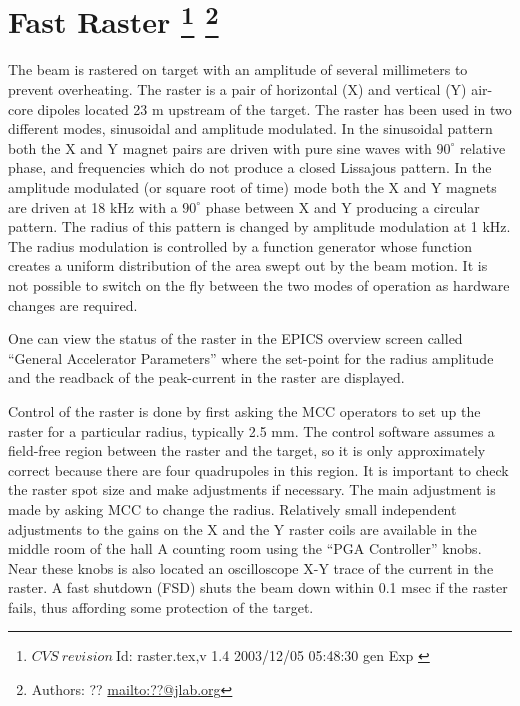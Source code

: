 \section[Fast Raster]{Fast Raster
\footnote{
  $CVS~revision~ $Id: raster.tex,v 1.4 2003/12/05 05:48:30 gen Exp $ $
}
\footnote{Authors: ?? \url{mailto:??@jlab.org}}
}

The beam is rastered on target with an amplitude of
several millimeters to prevent overheating.  
The raster is a pair of horizontal (X) and vertical (Y)
air-core dipoles located 23 m upstream of the
target. The raster has been used in two different modes,
sinusoidal and amplitude modulated. In the sinusoidal pattern
both the X and Y magnet pairs are driven with pure sine waves
with $90^{\circ}$ relative phase, 
and frequencies which do not produce a closed Lissajous pattern.
In the amplitude modulated (or square root of time) mode  
both the X and Y magnets are driven at 18 kHz with
a $90^{\circ}$ phase between X and Y producing  a circular
pattern. The radius of this pattern is changed by amplitude
modulation at 1 kHz. The radius modulation
is controlled by a function generator whose function
creates a uniform distribution of the area swept out
by the beam motion. It is not possible to switch on the fly
between the two modes of operation as hardware changes are required.

One can view the status of the raster in the
EPICS overview screen called ``General Accelerator
Parameters'' where the set-point for the radius amplitude
and the readback of the peak-current in the raster are displayed.

Control of the raster is done by first asking the MCC
operators to set up the raster for a particular radius, 
typically 2.5 mm.
The control software assumes a field-free region between
the raster and the target, so it is only approximately
correct because there are four quadrupoles in this region.
It is important to check the raster spot size and
make adjustments if necessary.  The main adjustment is made
by asking MCC to change the radius.
Relatively small independent adjustments to the 
gains on the X and the Y raster
coils are available in the middle room of the hall A
counting room using the ``PGA Controller'' knobs.
Near these knobs is also located an oscilloscope X-Y trace
of the current in the raster.  A fast shutdown (FSD) shuts
the beam down within 0.1 msec if the raster fails, thus
affording some protection of the target.

